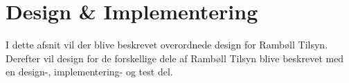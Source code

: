 \chapter{Design \& Implementering}
I dette afsnit vil der blive beskrevet overordnede design for Rambøll Tilsyn. Derefter vil design for de forskellige dele af Rambøll Tilsyn blive beskrevet med en design-, implementering- og test del. \\


